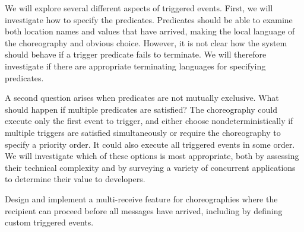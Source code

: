 We will explore several different aspects of triggered events.
First, we will investigate how to specify the predicates.
Predicates should be able to examine both location names and values that have arrived,
making the local language of the choreography and obvious choice.
However, it is not clear how the system should behave if a trigger predicate fails to terminate.
We will therefore investigate if there are appropriate terminating languages for specifying predicates.

A second question arises when predicates are not mutually exclusive.
What should happen if multiple predicates are satisfied?
The choreography could execute only the first event to trigger,
and either choose nondeterministically if multiple triggers are satisfied simultaneously
or require the choreography to specify a priority order.
It could also execute all triggered events in some order.
We will investigate which of these options is most appropriate,
both by assessing their technical complexity and by surveying a variety of concurrent applications to determine their value to developers.

\begin{goal}
  \label{goal:multi-receive}
  Design and implement a multi-receive feature for choreographies
  where the recipient can proceed before all messages have arrived,
  including by defining custom triggered events.
\end{goal}


